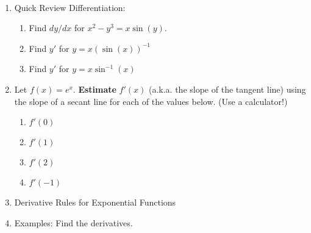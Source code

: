 \documentclass[11pt,fleqn]{article}
\begin{document}
\renewcommand{\headrulewidth}{0pt}
\newcommand{\blank}[1]{\rule{#1}{0.75pt}}
\newcommand{\bc}{\begin{center}}
\newcommand{\ec}{\end{center}}
\renewcommand{\d}{\displaystyle}

\vspace*{-0.7in}

\begin{center}
  \large
  \\
\end{center}
\begin{enumerate}
\item Quick Review Differentiation:
\begin{enumerate}
	\item  Find $dy/dx$ for $x^2-y^3=x \sin(y).$
	\vfill
	\item Find $y'$ for $y=x (\sin(x))^{-1}$
	\vfill
	\item Find $y'$ for $y=x \sin^{-1}(x)$
	\vfill
\end{enumerate}
\item Let $f(x)=e^x.$ \textbf{Estimate} $f'(x)$ (a.k.a. the slope of the tangent line) using the slope of a secant line for each of the values below. (Use a calculator!)
\begin{enumerate}
	\item $f'(0)$
	\vfill
	\item $f'(1)$
	\vfill
	\item $f'(2)$
	\vfill
	\item $f'(-1)$
	\vfill
\end{enumerate}
\item Derivative Rules for Exponential Functions	
\vspace{1.5in}
\newpage
\item Examples: Find the derivatives.


\end{enumerate}
\end{document}
